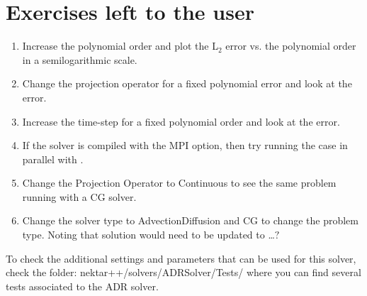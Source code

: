 \section{Exercises left to the user}
\begin{enumerate}
\item Increase the polynomial order and plot the L$_{2}$ error vs. the polynomial order 
in a semilogarithmic scale.
\item Change the projection operator for a fixed polynomial error and look at the error.
\item Increase the time-step for a fixed polynomial order and look at the error.
\item If the solver is compiled with the MPI option, then try running the case in parallel 
with .
\item Change the Projection Operator to Continuous to see the same problem running 
with a CG solver.
\item Change the solver type to AdvectionDiffusion and CG to change the problem type. 
Noting that solution would need to be updated to \dots $?$
\end{enumerate}

\begin{tipbox}
To check the additional settings and parameters that can be used for this solver,
check the folder: \textsf{nektar++/solvers/ADRSolver/Tests/}
where you can find several tests associated to the ADR solver.
\end{tipbox}


